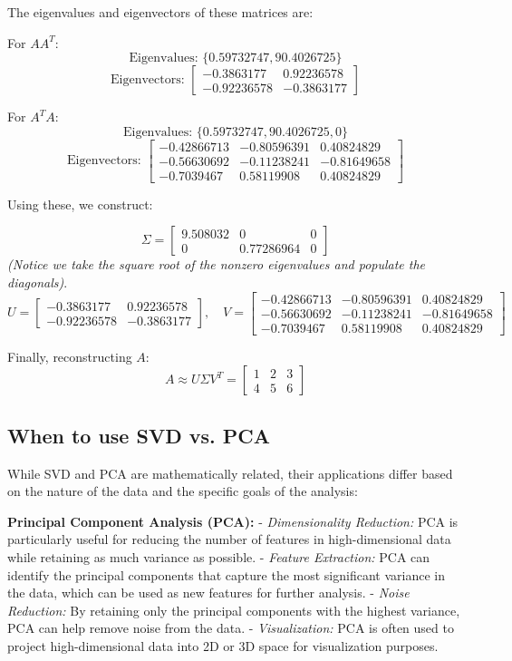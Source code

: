 \documentclass[12pt]{article}
\begin{document}
The eigenvalues and eigenvectors of these matrices are:

For \(AA^T\):
\[
\text{Eigenvalues: } \{0.59732747, 90.4026725\}
\]
\[
\text{Eigenvectors: }
\begin{bmatrix}
-0.3863177 & 0.92236578 \\
-0.92236578 & -0.3863177
\end{bmatrix}
\]

For \(A^TA\):
\[
\text{Eigenvalues: } \{0.59732747, 90.4026725, 0\}
\]
\[
\text{Eigenvectors: }
\begin{bmatrix}
-0.42866713 & -0.80596391 & 0.40824829 \\
-0.56630692 & -0.11238241 & -0.81649658 \\
-0.7039467 & 0.58119908 & 0.40824829
\end{bmatrix}
\]

Using these, we construct:

\[
\Sigma =
\begin{bmatrix}
9.508032 & 0 & 0 \\
0 & 0.77286964 & 0
\end{bmatrix}
\]
\textit{(Notice we take the square root of the nonzero eigenvalues and populate the diagonals)}.
\[
U =
\begin{bmatrix}
-0.3863177 & 0.92236578 \\
-0.92236578 & -0.3863177
\end{bmatrix},
\quad
V =
\begin{bmatrix}
-0.42866713 & -0.80596391 & 0.40824829 \\
-0.56630692 & -0.11238241 & -0.81649658 \\
-0.7039467 & 0.58119908 & 0.40824829
\end{bmatrix}
\]

Finally, reconstructing \(A\):
\[
A \approx U \Sigma V^T =
\begin{bmatrix}
1 & 2 & 3 \\
4 & 5 & 6
\end{bmatrix}
\]


\subsection{When to use SVD vs. PCA}

While SVD and PCA are mathematically related, their applications differ based on the nature of the data and the specific goals of the analysis:

\textbf{Principal Component Analysis (PCA):}
- \emph{Dimensionality Reduction:} PCA is particularly useful for reducing the number of features in high-dimensional data while retaining as much variance as possible.
- \emph{Feature Extraction:} PCA can identify the principal components that capture the most significant variance in the data, which can be used as new features for further analysis.
- \emph{Noise Reduction:} By retaining only the principal components with the highest variance, PCA can help remove noise from the data.
- \emph{Visualization:} PCA is often used to project high-dimensional data into 2D or 3D space for visualization purposes.
\end{document}
